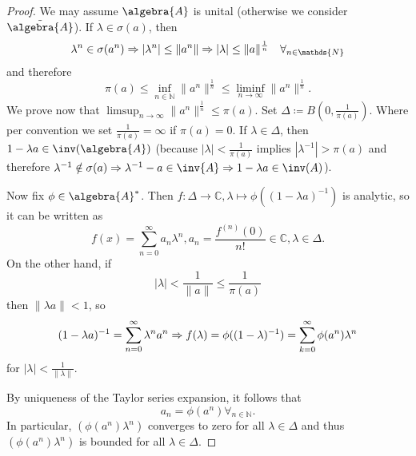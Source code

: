 \documentclass[a4paper]{article}
\begin{document}
\begin{proof}
	We may assume $\algebra{A}$ is unital (otherwise we consider $\tilde{\algebra{A}}$). If $\lambda \in \sigma(a)$, then
	\begin{equation*}
		\lambda^n \in \sigma(a^n) \then |\lambda^n| \leq \| a^n \| \then |\lambda| \leq \|a\|^{\frac{1}{n}} \quad \forall_{n \in \mathds{N}}
	\end{equation*}
	and therefore
	\begin{equation*}
		\pi(a) \leq \inf_{n \in \mathds{N}} \|a^n\|^{\frac{1}{n}} \leq \liminf_{n \to \infty} \|a^n\|^{\frac{1}{n}}\text{.}
	\end{equation*}
	We prove now that $\limsup_{n \to \infty} \|a^n\|^{\frac{1}{n}} \leq \pi(a)$. Set $\Delta \coloneq B\left(0, \frac{1}{\pi(a)}\right)$. Where per convention we set $\frac{1}{\pi(a)} = \infty$ if $\pi(a) = 0$. If $\lambda \in \Delta$, then $1 - \lambda a \in \inv(\algebra{A})$ (because $|\lambda| < \frac{1}{\pi(a)}$ implies $|\lambda^{-1}| > \pi(a)$ and therefore $\lambda^{-1} \notin \sigma(a) \then \lambda^{-1} - a \in \inv{A} \then 1 - \lambda a \in \inv(A)$).

	Now fix $\phi \in \algebra{A}^*$. Then $f: \Delta \to \mathds{C}, \lambda \mapsto \phi((1 - \lambda a)^{-1})$ is analytic, so it can be written as
	\begin{equation*}
		f(x) = \sum_{n = 0}^{\infty} a_n \lambda^n, a_n = \frac{f^{(n)}(0)}{n!} \in \mathds{C}, \lambda \in \Delta\text{.}
	\end{equation*}
	On the other hand, if
	\begin{equation*}
		|\lambda| < \frac{1}{\|a\|} \leq \frac{1}{\pi(a)}
	\end{equation*}
	then $\|\lambda a \| < 1$, so
	\begin{equation*}
		(1 - \lambda a)^{-1} = \sum_{n = 0}^{\infty} \lambda^n a^n \then f(\lambda) = \phi((1 - \lambda)^{-1}) = \sum_{k = 0}^{\infty} \phi(a^n) \lambda^n
	\end{equation*}
	for $|\lambda| < \frac{1}{\|\lambda\|}$.

	By uniqueness of the Taylor series expansion, it follows that
	\begin{equation*}
		a_n = \phi(a^n)	 \forall_{n \in \mathds{N}}\text{.}
	\end{equation*}
	In particular, $(\phi(a^n) \lambda^n)$ converges to zero for all $\lambda \in \Delta$ and thus $(\phi(a^n) \lambda^n)$ is bounded for all $\lambda \in \Delta$.


\end{proof}
\end{document}
